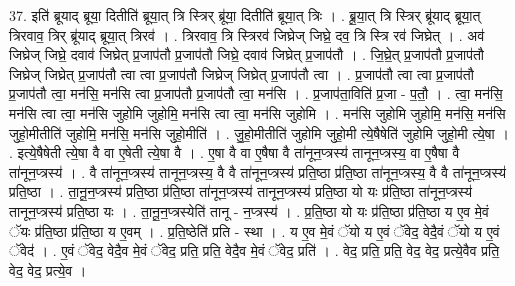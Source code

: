 \documentclass[17pt]{extarticle}
\begin{document}
37. इति॑ ब्रूयाद् ब्रूया॒ दितीति॑ ब्रूया॒त् त्रि स्त्रिर् ब्रू॑या॒ दितीति॑ ब्रूया॒त् त्रिः । . ब्रू॒या॒त् त्रि स्त्रिर् ब्रू॑याद् ब्रूया॒त् त्रिरवाव॒ त्रिर् ब्रू॑याद् ब्रूया॒त् त्रिरव॑ । . त्रिरवाव॒ त्रि स्त्रिरव॑ जिघ्रेज् जिघ्रे॒ दव॒ त्रि स्त्रि रव॑ जिघ्रेत् । . अव॑ जिघ्रेज् जिघ्रे॒ दवाव॑ जिघ्रेत् प्र॒जाप॑तौ प्र॒जाप॑तौ जिघ्रे॒ दवाव॑ जिघ्रेत् प्र॒जाप॑तौ । . जि॒घ्रे॒त् प्र॒जाप॑तौ प्र॒जाप॑तौ जिघ्रेज् जिघ्रेत् प्र॒जाप॑तौ त्वा त्वा प्र॒जाप॑तौ जिघ्रेज् जिघ्रेत् प्र॒जाप॑तौ त्वा । . प्र॒जाप॑तौ त्वा त्वा प्र॒जाप॑तौ प्र॒जाप॑तौ त्वा॒ मन॑सि॒ मन॑सि त्वा प्र॒जाप॑तौ प्र॒जाप॑तौ त्वा॒ मन॑सि । . प्र॒जाप॑ता॒विति॑ प्र॒जा - प॒तौ॒ । . त्वा॒ मन॑सि॒ मन॑सि त्वा त्वा॒ मन॑सि जुहोमि जुहोमि॒ मन॑सि त्वा त्वा॒ मन॑सि जुहोमि । . मन॑सि जुहोमि जुहोमि॒ मन॑सि॒ मन॑सि जुहो॒मीतीति॑ जुहोमि॒ मन॑सि॒ मन॑सि जुहो॒मीति॑ । . जु॒हो॒मीतीति॑ जुहोमि जुहो॒मी त्ये॒षैषेति॑ जुहोमि जुहो॒मी त्ये॒षा । . इत्ये॒षैषेती त्ये॒षा वै वा ए॒षेती त्ये॒षा वै । . ए॒षा वै वा ए॒षैषा वै ता॑नून॒प्त्रस्य॑ तानून॒प्त्रस्य॒ वा ए॒षैषा वै ता॑नून॒प्त्रस्य॑ । . वै ता॑नून॒प्त्रस्य॑ तानून॒प्त्रस्य॒ वै वै ता॑नून॒प्त्रस्य॑ प्रति॒ष्ठा प्र॑ति॒ष्ठा ता॑नून॒प्त्रस्य॒ वै वै ता॑नून॒प्त्रस्य॑ प्रति॒ष्ठा । . ता॒नू॒न॒प्त्रस्य॑ प्रति॒ष्ठा प्र॑ति॒ष्ठा ता॑नून॒प्त्रस्य॑ तानून॒प्त्रस्य॑ प्रति॒ष्ठा यो यः प्र॑ति॒ष्ठा ता॑नून॒प्त्रस्य॑ तानून॒प्त्रस्य॑ प्रति॒ष्ठा यः । . ता॒नू॒न॒प्त्रस्येति॑ तानू - न॒प्त्रस्य॑ । . प्र॒ति॒ष्ठा यो यः प्र॑ति॒ष्ठा प्र॑ति॒ष्ठा य ए॒व मे॒वं ॅयः प्र॑ति॒ष्ठा प्र॑ति॒ष्ठा य ए॒वम् । . प्र॒ति॒ष्ठेति॑ प्रति - स्था । . य ए॒व मे॒वं ॅयो य ए॒वं ॅवेद॒ वेदै॒वं ॅयो य ए॒वं ॅवेद॑ । . ए॒वं ॅवेद॒ वेदै॒व मे॒वं ॅवेद॒ प्रति॒ प्रति॒ वेदै॒व मे॒वं ॅवेद॒ प्रति॑ । . वेद॒ प्रति॒ प्रति॒ वेद॒ वेद॒ प्रत्ये॒वैव प्रति॒ वेद॒ वेद॒ प्रत्ये॒व । \newline
\end{document}
